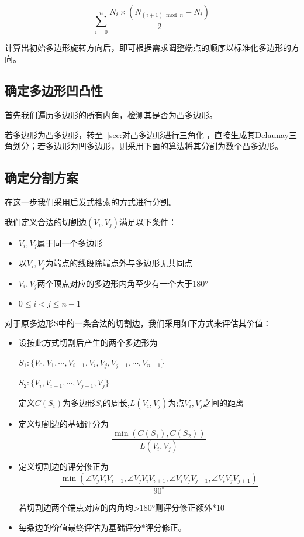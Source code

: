 \begin{equation}
\sum\limits_{i=0}^{n}{\frac{N_i\times (N_{(i+1)\bmod n}-N_i)}{2}}
\end{equation}

计算出初始多边形旋转方向后，即可根据需求调整端点的顺序以标准化多边形的方向。

\subsection{确定多边形凹凸性}
首先我们遍历多边形的所有内角，检测其是否为凸多边形。

若多边形为凸多边形，转至~\ref*{sec:对凸多边形进行三角化}，直接生成其Delaunay三角划分；若多边形为凹多边形，则采用下面的算法将其分割为数个凸多边形。
\subsection{确定分割方案}
在这一步我们采用启发式搜索的方式进行分割。

我们定义合法的切割边\(( V_i,V_j) \)满足以下条件：

\begin{itemize}
    \item \(V_i,V_j\)属于同一个多边形
    \item 以\(V_i,V_j\)为端点的线段除端点外与多边形无共同点
    \item \(V_i,V_j\)两个顶点对应的多边形内角至少有一个大于180°
    \item \(0\le i<j\le n-1\)
\end{itemize}
对于原多边形S中的一条合法的切割边，我们采用如下方式来评估其价值：

\begin{itemize}
    \item 设按此方式切割后产生的两个多边形为

    \(S_1:\{ V_0,V_1,\cdots,V_{i-1},V_i,V_j,V_{j+1},\cdots,V_{n-1}\} \)

    \(S_2:\{ V_i,V_{i+1},\cdots,V_{j-1},V_j\}\)

    定义\(C(S_i)\)为多边形\(S_i\)的周长,\quad \(L(V_i,V_j)\)为点\(V_i,V_j\)之间的距离

    \item 定义切割边的基础评分为
    \begin{equation}
        \frac {\min(C(S_1),C(S_2))}{L(V_i,V_j)}
    \end{equation}
    \item 定义切割边的评分修正为
    \begin{equation}
        \frac {\min(\angle V_jV_iV_{i-1},\angle V_jV_iV_{i+1},\angle V_iV_jV_{j-1},\angle V_iV_jV_{j+1})}{90^\circ}
    \end{equation}

    若切割边两个端点对应的内角均>180°则评分修正额外*10

    \item 每条边的价值最终评估为基础评分*评分修正。
    
\end{itemize}


